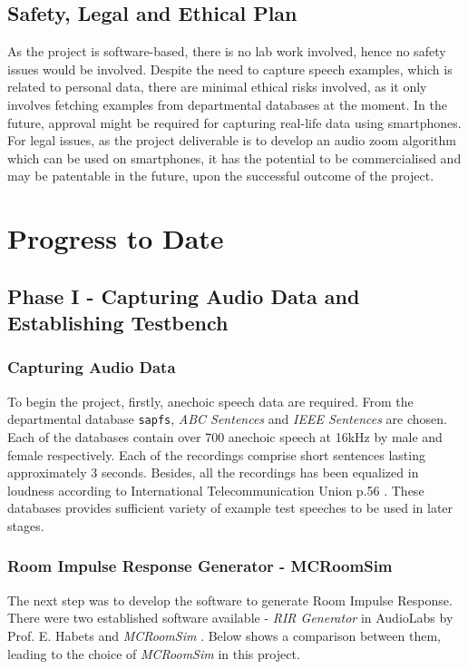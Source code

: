 \documentclass[a4paper,twoside,12pt,hidelinks]{article}
\begin{document}
\subsection{Safety, Legal and Ethical Plan}
As the project is software-based, there is no lab work involved, hence no safety issues would be involved. Despite the need to capture speech examples, which is related to personal data, there are minimal ethical risks involved, as it only involves fetching examples from departmental databases at the moment. In the future, approval might be required for capturing real-life data using smartphones. For legal issues, as the project deliverable is to develop an audio zoom algorithm which can be used on smartphones, it has the potential to be commercialised and may be patentable in the future, upon the successful outcome of the project.
\newpage
\section{Progress to Date}
\subsection{Phase I - Capturing Audio Data and Establishing Testbench}
\subsubsection{Capturing Audio Data}
To begin the project, firstly, anechoic speech data are required. From the departmental database \texttt{sapfs}, \textit{ABC Sentences} and \textit{IEEE Sentences} are chosen. Each of the databases contain over 700 anechoic speech at 16kHz by male and female respectively. Each of the recordings comprise short sentences lasting approximately 3 seconds. Besides, all the recordings has been equalized in loudness according to International Telecommunication Union p.56 \cite{ITU-T2011Rec.Level}. These databases provides sufficient variety of example test speeches to be used in later stages.

\subsubsection{Room Impulse Response Generator - MCRoomSim}
The next step was to develop the software to generate Room Impulse Response. There were two established software available - \textit{RIR Generator} in AudioLabs by Prof. E. Habets \cite{Habets2017RoomMATLAB} and \textit{MCRoomSim} \cite{Schimmel2009ASimulator,Wabnitz2010RoomArrays}. Below shows a comparison between them, leading to the choice of \textit{MCRoomSim} in this project.
\end{document}
